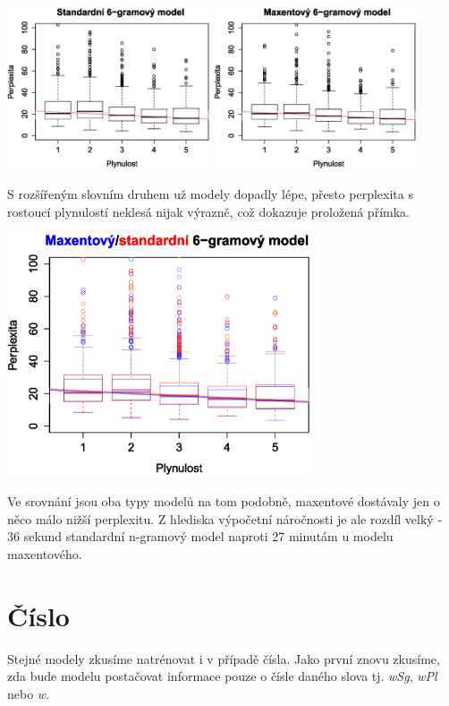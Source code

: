 \documentclass[12pt,a4paper]{report}
\begin{document}
\begin{center}
	\includegraphics[width=60mm]{./grafy/morf/ngram/rsd+rod.svg.eps}
	\includegraphics[width=60mm]{./grafy/morf/maxent/rsd+rod.svg.eps}
\end{center}
S rozšířeným slovním druhem už modely dopadly lépe, přesto perplexita s rostoucí plynulostí neklesá nijak výrazně, což dokazuje proložená přímka.
\begin{center}
	\includegraphics[width=90mm]{./grafy/morf/porovnani/rsd+rod.svg.eps}	
\end{center}
Ve srovnání jsou oba typy modelů na tom podobně, maxentové dostávaly jen o něco málo nižší perplexitu. Z hlediska výpočetní náročnosti je ale rozdíl velký - 36 sekund standardní n-gramový model naproti 27 minutám u modelu maxentového.

\section{Číslo}
Stejné modely zkusíme natrénovat i v případě čísla. Jako první znovu zkusíme, zda bude modelu postačovat informace pouze o čísle daného slova tj. \textit{wSg}, \textit{wPl} nebo \textit{w}.
\end{document}
